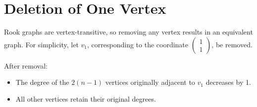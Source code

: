 \documentclass{article}
\begin{document}

\section{Deletion of One Vertex}

Rook graphs are vertex-transitive, so removing any vertex results in an equivalent graph. For simplicity, let \( v_1 \), corresponding to the coordinate \( \begin{pmatrix} 1 \\ 1 \end{pmatrix} \), be removed. 

After removal:
\begin{itemize}
    \item The degree of the \( 2(n-1) \) vertices originally adjacent to \( v_1 \) decreases by 1.
    \item All other vertices retain their original degrees.
\end{itemize}
\end{document}
